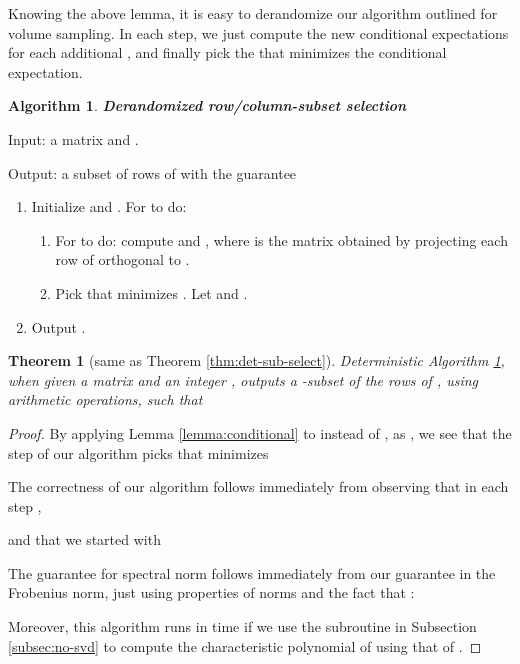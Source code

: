\documentclass[11pt]{article}
\newtheorem{theorem}{Theorem}
\newtheorem{alg}{Algorithm}
\begin{document}
Knowing the above lemma, it is easy to derandomize our algorithm outlined for volume sampling. In each step, we just compute the new conditional expectations for each additional , and finally pick the  that minimizes the conditional expectation.

\begin{framed}
\begin{alg} \label{alg:derand}
{\bf Derandomized row/column-subset selection}
\end{alg}
\noindent Input: a matrix  and .

\noindent Output: a subset  of  rows of  with the guarantee


\begin{enumerate}
\item Initialize  and . For  to  do:
\begin{enumerate}
\item For  to  do: compute  and , where  is the matrix obtained by projecting each row of  orthogonal to .
\item Pick  that minimizes . Let  and .
\end{enumerate}
\item Output .
\end{enumerate}
\end{framed}

\begin{theorem}[same as Theorem \ref{thm:det-sub-select}]
Deterministic Algorithm \ref{alg:derand}, when given a matrix  and an integer , outputs a -subset  of the rows of , using  arithmetic operations, such that

\end{theorem}
\begin{proof}
By applying Lemma \ref{lemma:conditional} to  instead of , as , we see that the step  of our algorithm picks  that minimizes

The correctness of our algorithm follows immediately from observing that in each step ,

and that we started with


The guarantee for spectral norm follows immediately from our guarantee in the Frobenius norm, just using properties of norms and the fact that :


Moreover, this algorithm runs in time  if we use the subroutine in Subsection \ref{subsec:no-svd} to compute the characteristic polynomial of  using that of .
\end{proof}
\end{document}
